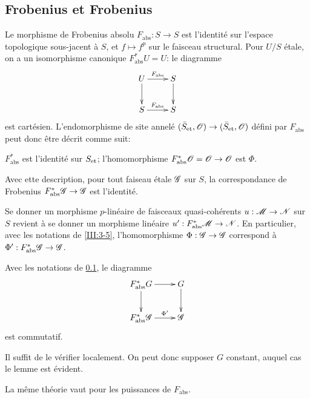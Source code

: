 \subsection{Frobenius et Frobenius}\label{III:3-4}

Le morphisme de Frobenius absolu $F_\text{abs}:S\to S$ est l'identit\'e sur 
l'espace topologique sous-jacent \`a $S$, et $f\mapsto f^p$ sur le faisceau 
structural. Pour $U/S$ \'etale, on a un isomorphisme canonique 
$F_\text{abs}^* U=U$: le diagramme 
\[\xymatrix{
  U \ar[r]^-{F_\text{abs}} \ar[d] 
    & S \ar[d] \\
  S \ar[r]^-{F_\text{abs}} 
    & S
}\]
est cart\'esien. L'endomorphisme de site annel\'e 
$({\bar S}_{\textnormal{et}},\mathscr{O})\to({\bar S}_{\textnormal{et}},\mathscr{O})$ d\'efini par $F_\text{abs}$ peut donc 
\^etre d\'ecrit comme suit:
\begin{center}
  $F_\text{abs}^*$ est l'identit\'e sur ${S}_{\textnormal{et}}$; l'homomorphisme 
  $F_\text{abs}^*\mathscr{O}=\mathscr{O}\to\mathscr{O}$ est $\Phi$.
\end{center}
Avec ette description, pour tout faiseau \'etale $\mathscr{G}$ sur $S$, la 
correspondance de Frobenius $F_\text{abs}^*\mathscr{G}\to\mathscr{G}$ est l'identit\'e. 

Se donner un morphisme $p$-lin\'eaire de faisceaux quasi-coh\'erents 
$u:\mathscr{M}\to\mathscr{N}$ sur $S$ revient \`a se donner un morphisme lin\'eaire 
$u':F_\text{abs}^*\mathscr{M}\to\mathscr{N}$. En particulier, avec les notations de 
\ref{III:3-5}, l'homomorphisme $\Phi:\mathscr{G}\to\mathscr{G}$ correspond \`a 
$\Phi':F_\text{abs}^*\mathscr{G}\to\mathscr{G}$. 





\begin{lemma_}\label{III:3-5}
Avec les notations de \ref{III:3-4}, le diagramme 
\[\xymatrix{
  F_\textnormal{abs}^* G \ar[r] \ar[d] 
    & G \ar[d] \\
  F_\textnormal{abs}^*\cG \ar[r]^-{\Phi'} 
    & \cG 
}\]
est commutatif.
\end{lemma_}

Il suffit de le v\'erifier localement. On peut donc supposer $G$ constant, 
auquel cas le lemme est \'evident. 

La m\^eme th\'eorie vaut pour les puissances de $F_\text{abs}$.





\subsection{}\label{III:3-6}

